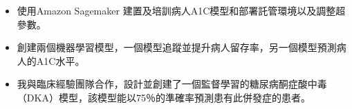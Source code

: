 \documentclass[10pt,a4paper,ragged2e,withhyper]{altacv}
\begin{document}
\begin{paracol}{2}
    \begin{itemize}
        \item 使用Amazon Sagemaker 建置及培訓病人A1C模型和部署託管環境以及調整超參數。
        \item 創建兩個機器學習模型，一個模型追蹤並提升病人留存率，另一個模型預測病人的A1C水平。
        \item 我與臨床經驗團隊合作，設計並創建了一個監督學習的糖尿病酮症酸中毒（DKA）模型，該模型能以75％的準確率預測患有此併發症的患者。
    \end{itemize}
\end{paracol}
\end{document}
